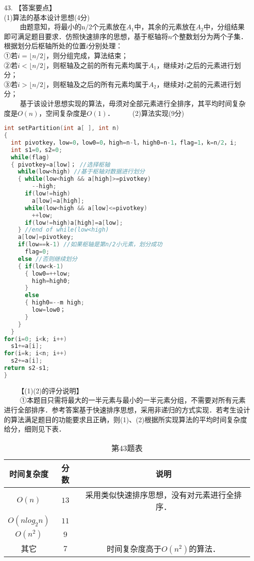 43. 【答案要点】 \\
(1)算法的基本设计思想(4分) \\
$\qquad$ 由题意知，将最小的n/2个元素放在$A_1$中，其余的元素放在$A_2$中，分组结果即可满足题目要求．仿照快速排序的思想，基于枢轴将$n$个整数划分为两个子集．根据划分后枢轴所处的位置$i$分别处理： \\
①若$i= \lfloor n/2 \rfloor$，则分组完成，算法结束； \\
②若$i< \lfloor n/2 \rfloor $，则枢轴及之前的所有元素均属于$A_1$，继续对$i$之后的元素进行划分； \\
③若$i> \lfloor n/2 \rfloor$，则枢轴及之后的所有元素均属于$A_2$，继续对$i$之前的元素进行划分； \\
$\qquad$ 基于该设计思想实现的算法，毋须对全部元素进行全排序，其平均时间复杂度是$O(n)$，空间复杂度是$O(1)$．
$\qquad$ (2)算法实现(9分) \\
\begin{lstlisting}[language=cpp]
int setPartition(int a[ ], int n)
{ 
  int pivotkey，low=0，low0=0，high=n-l，high0=n-1，flag=1，k=n/2，i;
  int s1=0，s2=0;
  while(flag)
  { pivotkey=a[low]； //选择枢轴
    while(low<high) //基于枢轴对数据进行划分
    { while(low<high && a[high]>=pivotkey)
        --high;
      if(low!=high)
        a[low]=a[high];
      while(low<high && a[low]<=pivotkey)
        ++low;
      if(low!=high)a[high]=a[low];
    } //end of while(low<high)
    a[low]=pivotkey;
    if(low==k-1) //如果枢轴是第n/2小元素，划分成功
      flag=0;
    else //否则继续划分
    { if(low<k-1)
      { low0=++low;
        high=high0;
      }
      else
      { high0=--m high;
        low=low0；
      }
    }
  }
for(i=0; i<k; i++)
  s1+=a[i];
for(i=k; i<n; i++)
  s2+=a[i];
return s2-s1;
}
\end{lstlisting}
$\qquad$【(1)(2)的评分说明】 \\
$\qquad$ ①本题目只需将最大的一半元素与最小的一半元素分组，不需要对所有元素进行全部排序．参考答案基于快速排序思想，采用非递归的方式实现．若考生设计的算法满足题目的功能要求且正确，则(1)、(2)根据所实现算法的平均时间复杂度给分，细则见下表．
\begin{table}[ht]
\centering
\caption{第43题表}\label{CSN16_tab5}
\begin{tabular}{|c|c|c|}
\hline
时间复杂度 & 分数 & 说明 \\
\hline
$O(n)$ & $13$ & 采用类似快速排序思想，没有对元素进行全排序． \\
\hline
$O(nlog_2n)$ & $11$ &  \\
\hline
$O(n^2)$ & $9$ &  \\
\hline
其它 & $7$ & 时间复杂度高于$O(n^2)$的算法． \\
\hline
\end{tabular}
\end{table}
